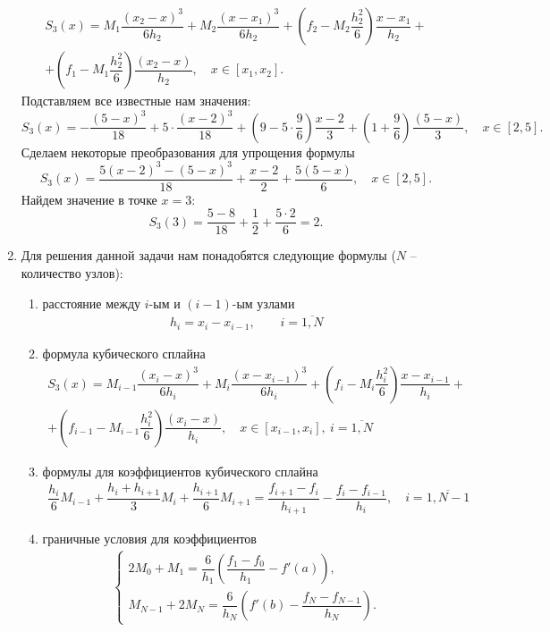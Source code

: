 \documentclass[a4paper, 12pt]{article}
\begin{document}
\begin{enumerate}
\begin{multline*}
			S_3(x) = M_1\dfrac{(x_2 - x)^3}{6h_2} + M_{2}\dfrac{(x-x_1)^3}{6h_2} + \left(f_2 - M_2\dfrac{h_2^2}{6}\right)\dfrac{x-x_1}{h_2} +\\+ \left(f_1 - M_1\dfrac{h_2^2}{6}\right)\dfrac{(x_2 - x)}{h_2},\quad x\in [x_1, x_2].
		\end{multline*}
		Подставляем все известные нам значения:
		$$
		S_3(x) = -\dfrac{(5 - x)^3}{18} +5\cdot\dfrac{(x-2)^3}{18} + \left(9 -5\cdot\dfrac{9}{6}\right)\dfrac{x-2}{3} + \left(1 + \dfrac{9}{6}\right)\dfrac{(5 - x)}{3},\quad x\in [2, 5].
		$$
		Сделаем некоторые преобразования для упрощения формулы
		$$
		S_3(x) = \dfrac{5(x - 2)^3 - (5-x)^3}{18} + \dfrac{x-2}{2} + \dfrac{5(5 - x)}{6},\quad x\in [2, 5].
		$$
		Найдем значение в точке $x=3$:
		$$
		S_3(3) = \dfrac{5 - 8}{18} + \dfrac{1}{2} + \dfrac{5\cdot 2}{6} = 2.
		$$
		\newpage
		\item 
		\hypertarget{t3}{}
		Для решения данной задачи нам понадобятся следующие формулы ($N$ -- количество узлов):\begin{enumerate}
			\item расстояние между $i$-ым и $(i-1)$-ым узлами \begin{eqnarray}
				h_i=x_i - x_{i-1},\qquad i=\overline{1,N}\label{1}
			\end{eqnarray}
			\item формула кубического сплайна\begin{multline}
				S_3(x) = M_{i-1}\dfrac{(x_i - x)^3}{6h_i} + M_{i}\dfrac{(x-x_{i-1})^3}{6h_i} + \left(f_i - M_i\dfrac{h_i^2}{6}\right)\dfrac{x-x_{i-1}}{h_i} +\\+ \left(f_{i-1} - M_{i-1}\dfrac{h_i^2}{6}\right)\dfrac{(x_i - x)}{h_i},\quad x\in [x_{i-1}, x_i],\ i = \overline{1,N}
			\end{multline}
			\item формулы для коэффициентов кубического сплайна
			\begin{multline}
				\dfrac{h_i}{6}M_{i-1} + \dfrac{h_i + h_{i+1}}{3}M_i + \dfrac{h_{i+1}}{6}M_{i+1} = \dfrac{f_{i+1} - f_i}{h_{i+1}} - \dfrac{f_i - f_{i-1}}{h_i},\quad i = \overline {1,N-1}
			\end{multline}
			\item граничные условия для коэффициентов \begin{eqnarray}
				\begin{cases}
					2M_0 + M_1 = \dfrac{6}{h_1}\left(\dfrac{f_1-f_0}{h_1} - f'(a)\right),\\
					M_{N-1} + 2M_N = \dfrac{6}{h_N}\left(f'(b) - \dfrac{f_N-f_{N-1}}{h_N} \right).

\end{cases}
\end{eqnarray}
\end{enumerate}
\end{enumerate}
\end{document}
